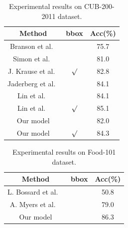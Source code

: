 \documentclass[10pt,twocolumn,letterpaper]{article}
\begin{document}
\begin{table}[t]
\centering
\begin{tabular}
{c||c|c}\hline
Method &  bbox &  Acc(\%) \\\hline\hline
Branson et al.~\cite{bd15} & & 75.7 \\
Simon et al.~\cite{bd28} & & 81.0 \\
J. Krause et al.~\cite{bd22} &  $\surd$ & 82.8 \\
Jaderberg et al.~\cite{jaderberg2015spatial}&  & 84.1 \\
Lin et al.~\cite{bd16} & $ $ &  84.1 \\
Lin et al.~\cite{bd16} & $\surd$ &  85.1 \\ \hline
Our model & &82.0 \\
Our model & $\surd$ & 84.3 \\  \hline
\end{tabular}
\caption{Experimental results on CUB-200-2011 dataset.}
\label{tab:bird}
\end{table}

\begin{table}[t]
\centering
\begin{tabular}
{c||c|c}\hline
Method &  bbox & Acc(\%) \\\hline\hline
L. Bossard et al. ~\cite{cvpr_ref1} & & 50.8 \\
A. Myers et al.  ~\cite{cvpr_ref2} & & 79.0 \\ \hline
Our model & & 86.3 \\ \hline
\end{tabular}
\caption{Experimental results on Food-101 dataset.}
\label{tab:food}
\end{table}
\end{document}
